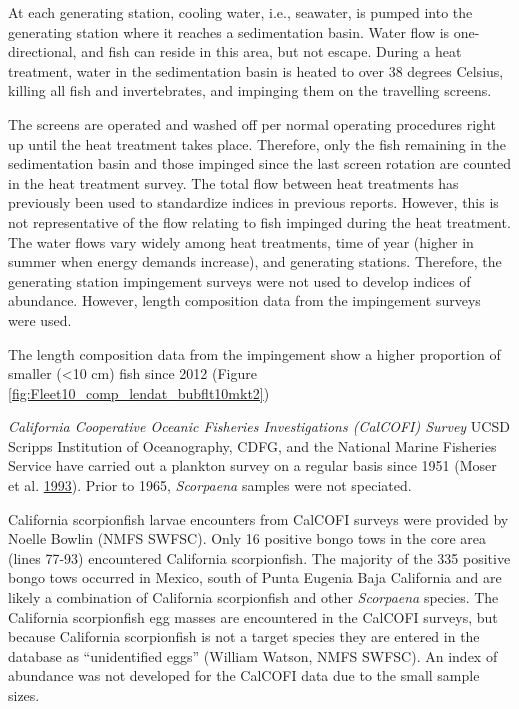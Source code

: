 \documentclass[12pt,]{article}
\begin{document}
At each generating station, cooling water, i.e., seawater, is pumped
into the generating station where it reaches a sedimentation basin.
Water flow is one-directional, and fish can reside in this area, but not
escape. During a heat treatment, water in the sedimentation basin is
heated to over 38 degrees Celsius, killing all fish and invertebrates,
and impinging them on the travelling screens.

The screens are operated and washed off per normal operating procedures
right up until the heat treatment takes place. Therefore, only the fish
remaining in the sedimentation basin and those impinged since the last
screen rotation are counted in the heat treatment survey. The total flow
between heat treatments has previously been used to standardize indices
in previous reports. However, this is not representative of the flow
relating to fish impinged during the heat treatment. The water flows
vary widely among heat treatments, time of year (higher in summer when
energy demands increase), and generating stations. Therefore, the
generating station impingement surveys were not used to develop indices
of abundance. However, length composition data from the impingement
surveys were used.

The length composition data from the impingement show a higher
proportion of smaller (\textless{}10 cm) fish since 2012 (Figure
\ref{fig:Fleet10_comp_lendat_bubflt10mkt2})

\emph{California Cooperative Oceanic Fisheries Investigations (CalCOFI)
Survey} UCSD Scripps Institution of Oceanography, CDFG, and the National
Marine Fisheries Service have carried out a plankton survey on a regular
basis since 1951 (Moser et al. \protect\hyperlink{ref-Moser1993}{1993}).
Prior to 1965, \emph{Scorpaena} samples were not speciated.

California scorpionfish larvae encounters from CalCOFI surveys were
provided by Noelle Bowlin (NMFS SWFSC). Only 16 positive bongo tows in
the core area (lines 77-93) encountered California scorpionfish. The
majority of the 335 positive bongo tows occurred in Mexico, south of
Punta Eugenia Baja California and are likely a combination of California
scorpionfish and other \emph{Scorpaena} species. The California
scorpionfish egg masses are encountered in the CalCOFI surveys, but
because California scorpionfish is not a target species they are entered
in the database as ``unidentified eggs'' (William Watson, NMFS SWFSC).
An index of abundance was not developed for the CalCOFI data due to the
small sample sizes.
\end{document}
